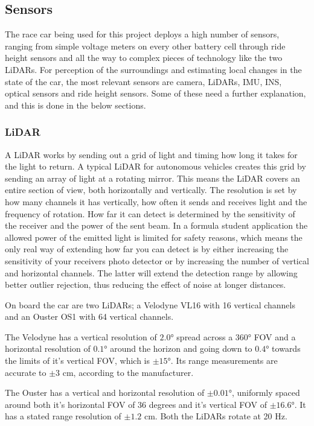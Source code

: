 \subsection{Sensors}
The race car being used for this project deploys a high number of sensors, ranging from simple voltage meters on every other battery cell through ride height sensors and all the way to complex pieces of technology like the two \glspl{LiDAR}. For perception of the surroundings and estimating local changes in the state of the car, the most relevant sensors are camera, \glspl{LiDAR}, \gls{IMU}, \gls{INS}, optical sensors and ride height sensors. Some of these need a further explanation, and this is done in the below sections.

\subsubsection{LiDAR}
A \gls{LiDAR} works by sending out a grid of light and timing how long it takes for the light to return. A typical \gls{LiDAR} for autonomous vehicles creates this grid by sending an array of light at a rotating mirror. This means the \gls{LiDAR} covers an entire section of view, both horizontally and vertically. The resolution is set by how many channels it has vertically, how often it sends and receives light and the frequency of rotation. How far it can detect is determined by the sensitivity of the receiver and the power of the sent beam. In a formula student application the allowed power of the emitted light is limited for safety reasons, which means the only real way of extending how far you can detect is by either increasing the sensitivity of your receivers photo detector or by increasing the number of vertical and horizontal channels. The latter will extend the detection range by allowing better outlier rejection, thus reducing the effect of noise at longer distances. 

On board the car are two \glspl{LiDAR}; a Velodyne VL16 with 16 vertical channels and an Ouster OS1 with 64 vertical channels. 

The Velodyne has a vertical resolution of $2.0$\si{\degree} spread across a $360$\si{\degree} \gls{FOV} and a horizontal resolution of $0.1$\si{\degree} around the horizon and going down to $0.4$\si{\degree} towards the limits of it's vertical \gls{FOV}, which is $\pm 15$\si{\degree}. Its range measurements are accurate to $\pm 3$ \si{\cm}, according to the manufacturer. 

The Ouster has a vertical and horizontal resolution of $\pm0.01$\si{\degree}, uniformly spaced around both it's horizontal \gls{FOV} of $36$ degrees and it's vertical \gls{FOV} of $\pm 16.6$\si{\degree}. It has a stated range resolution of $\pm 1.2$ \si{\cm}. Both the \glspl{LiDAR} rotate at 20 \si{\hertz}. 

